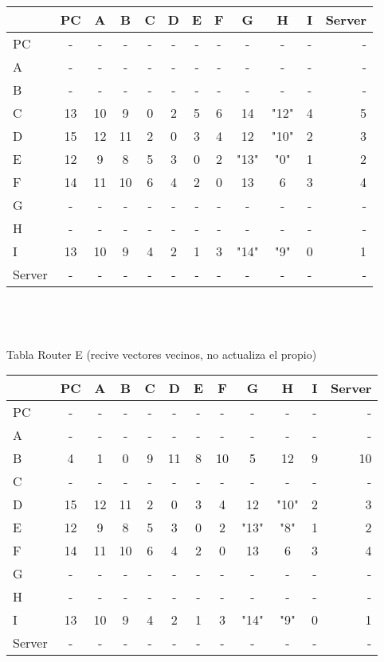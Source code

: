\documentclass{article}
\begin{document}
\begin{tabular}{l*{10}{c}r}
              & PC & A & B & C & D & E & F & G & H & I & Server \\
\hline
PC             & - & - & - & - & - & - & - & - & - & - & -\\
A              & - & - & - & - & - & - & - & - & - & - & -\\
B              & - & - & - & - & - & - & - & - & - & - & -\\
C              & 13 & 10 & 9 & 0 & 2 & 5 & 6 & 14 & "12" & 4 & 5\\
D              & 15 & 12 & 11 & 2 & 0 & 3 & 4 & 12 & "10" & 2 & 3\\
E              & 12 & 9 & 8 & 5 & 3 & 0 & 2 & "13" & "0" & 1 & 2\\
F              & 14 & 11 & 10 & 6 & 4 & 2 & 0 & 13 & 6 & 3 & 4\\
G              & - & - & - & - & - & - & - & - & - & - & -\\
H              & - & - & - & - & - & - & - & - & - & - & -\\
I              & 13 & 10 & 9 & 4 & 2 & 1 & 3 & "14" & "9" & 0 & 1\\
Server         & - & - & - & - & - & - & - & - & - & - & -\\

\end{tabular}\\
\\
\\
Tabla Router E (recive vectores vecinos, no actualiza el propio) \\
\begin{tabular}{l*{10}{c}r}
              & PC & A & B & C & D & E & F & G & H & I & Server \\
\hline
PC             & - & - & - & - & - & - & - & - & - & - & -\\
A              & - & - & - & - & - & - & - & - & - & - & -\\
B              & 4 & 1 & 0 & 9 & 11	& 8 & 10 & 5 & 12 & 9 & 10\\
C              & - & - & - & - & - & - & - & - & - & - & -\\
D              & 15 & 12 & 11 & 2 & 0 & 3 & 4 & 12 & "10" & 2 & 3\\
E              & 12 & 9 & 8 & 5 & 3 & 0 & 2 & "13" & "8" & 1 & 2\\
F              & 14 & 11 & 10 & 6 & 4 & 2 & 0 & 13 & 6 & 3 & 4\\
G              & - & - & - & - & - & - & - & - & - & - & -\\
H              & - & - & - & - & - & - & - & - & - & - & -\\
I              & 13 & 10 & 9 & 4 & 2 & 1 & 3 & "14" & "9" & 0 & 1\\
Server         & - & - & - & - & - & - & - & - & - & - & -\\

\end{tabular}
\end{document}
